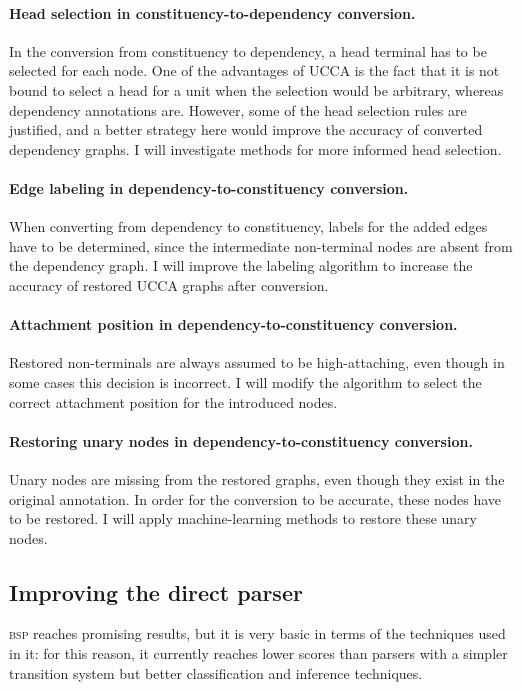 \documentclass[12pt]{article}
\begin{document}
\paragraph{Head selection in constituency-to-dependency conversion.}
In the conversion from constituency to dependency, a head terminal has to be
selected for each node. One of the advantages of UCCA is the fact that it is not bound
to select a head for a unit when the selection would be arbitrary, whereas dependency
annotations are. However, some of the head selection rules are justified, and a
better strategy here would improve the accuracy of converted dependency graphs.
I will investigate methods for more informed head selection.

\paragraph{Edge labeling in dependency-to-constituency conversion.}
When converting from dependency to constituency, labels for the
added edges have to be determined, since the intermediate non-terminal nodes are absent
from the dependency graph. I will improve the labeling algorithm to
increase the accuracy of restored UCCA graphs after conversion.

\paragraph{Attachment position in dependency-to-constituency conversion.}
Restored non-terminals are always assumed to be high-attaching, even though
in some cases this decision is incorrect.
I will modify the algorithm to select the correct attachment position for the introduced nodes.

\paragraph{Restoring unary nodes in dependency-to-constituency conversion.}
Unary nodes are missing from the restored graphs, even though they exist in the
original annotation. In order for the conversion to be accurate, these nodes have to
be restored.
I will apply machine-learning methods \cite{fernandez2015parsing} to restore these unary nodes.

\subsection{Improving the direct parser}\label{sec:improving_bsp}
\textsc{bsp} reaches promising results, but it is very basic in terms of the
techniques used in it: for this reason, it currently reaches lower scores than parsers
with a simpler transition system but better classification and inference techniques.
\end{document}
